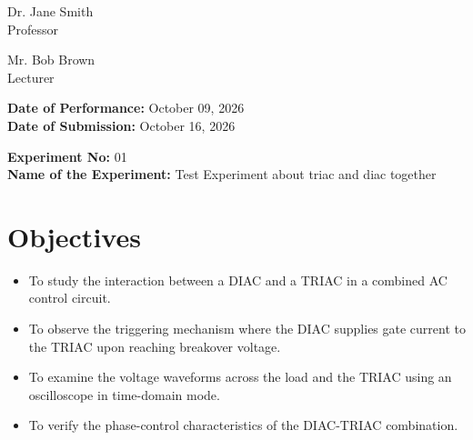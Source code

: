 \documentclass[12pt,a4paper]{article}
\begin{document}
\begin{titlepage}
\begin{minipage}[t]{0.5\textwidth}
\begin{flushright}
            Dr. Jane Smith \\
            Professor \\
            \vspace{0.3cm}
            
            Mr. Bob Brown \\
            Lecturer \\
            
            
        \end{flushright}
    \end{minipage}

    \vfill
    \textbf{Date of Performance:} October 09, 2026 \\
    \textbf{Date of Submission:} October 16, 2026
    
\end{titlepage}

\setcounter{page}{1}
\rmfamily %
\normalsize

\begin{center}
    \textbf{Experiment No:} 01 \\
    \vspace{0.2cm}
    \textbf{Name of the Experiment:} Test Experiment about triac and diac together
\end{center}
\vspace{0.5cm}


\section{Objectives}
\begin{itemize}

    \item To study the interaction between a DIAC and a TRIAC in a combined AC control circuit.

    \item To observe the triggering mechanism where the DIAC supplies gate current to the TRIAC upon reaching breakover voltage.

    \item To examine the voltage waveforms across the load and the TRIAC using an oscilloscope in time-domain mode.

    \item To verify the phase-control characteristics of the DIAC-TRIAC combination.

\end{itemize}
\end{document}
